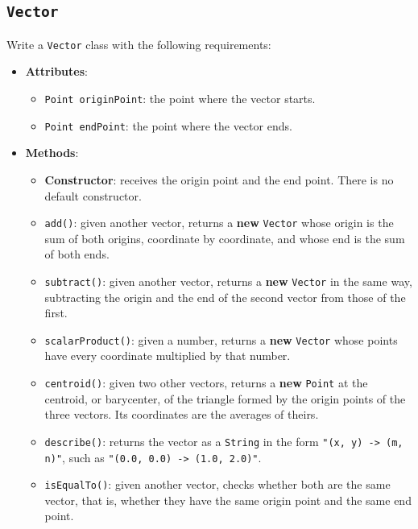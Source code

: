 \subsection{\texttt{Vector}}

Write a \texttt{Vector} class with the following requirements:

\begin{itemize}

    \item \textbf{Attributes}:

        \begin{itemize}

            \item \texttt{Point originPoint}: the point where the vector starts.

            \item \texttt{Point endPoint}: the point where the vector ends.

        \end{itemize}

    \item \textbf{Methods}:

        \begin{itemize}

            \item \textbf{Constructor}: receives the origin point and the end point. There is no default constructor.

            \item \texttt{add()}: given another vector, returns a \textbf{new} \texttt{Vector} whose origin is the sum of both origins, coordinate by coordinate, and whose end is the sum of both ends.

            \item \texttt{subtract()}: given another vector, returns a \textbf{new} \texttt{Vector} in the same way, subtracting the origin and the end of the second vector from those of the first.

            \item \texttt{scalarProduct()}: given a number, returns a \textbf{new} \texttt{Vector} whose points have every coordinate multiplied by that number.

            \item \texttt{centroid()}: given two other vectors, returns a \textbf{new} \texttt{Point} at the centroid, or barycenter, of the triangle formed by the origin points of the three vectors. Its coordinates are the averages of theirs.

            \item \texttt{describe()}: returns the vector as a \texttt{String} in the form \texttt{"(x, y) -\textgreater{} (m, n)"}, such as \texttt{"(0.0, 0.0) -\textgreater{} (1.0, 2.0)"}.

            \item \texttt{isEqualTo()}: given another vector, checks whether both are the same vector, that is, whether they have the same origin point and the same end point.

        \end{itemize}

\end{itemize}

